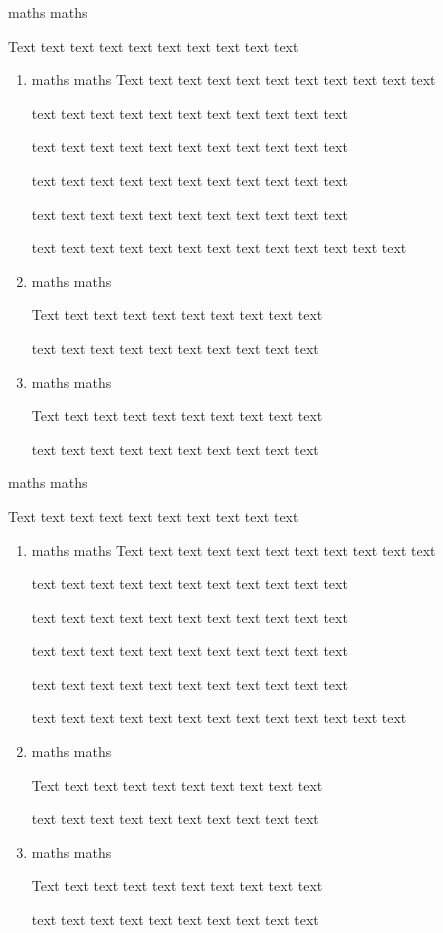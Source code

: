\documentclass[12pt,a4paper,openany]{report}
\begin{document}
\begin{exercise}
	maths maths
	
	Text text text text text text text text text text 
	
	
	\begin{enumerate}
		\item 
		
		maths maths
		Text text text text text text text text text text text
		
		text text text text text text text text text text text
		
		text text text text text text text text text text text
		
		text text text text text text text text text text text
		
		text text text text text text text text text text text
		
		text text text text text text text text text text text text text
		\item
		
		maths maths
		
		Text text text text text text text text text text 
		
		text text text text text text text text text text
		
		\item 
		
		maths maths
		
		Text text text text text text text text text text 
		
		text text text text text text text text text text
		
		
	\end{enumerate}
	\tcblower
	maths maths
	
	Text text text text text text text text text text 
	
	
	\begin{enumerate}
		\item 
		
		maths maths
		Text text text text text text text text text text text
		
		text text text text text text text text text text text
		
		text text text text text text text text text text text
		
		text text text text text text text text text text text
		
		text text text text text text text text text text text
		
		text text text text text text text text text text text text text
		\item
		
		maths maths
		
		Text text text text text text text text text text 
		
		text text text text text text text text text text
		
		\item 
		
		maths maths
		
		Text text text text text text text text text text 
		
		text text text text text text text text text text
		
		
	\end{enumerate}
\end{exercise}
\tcbstoprecording
\tcbstoprecording
\tcbinputrecords
\end{document}

